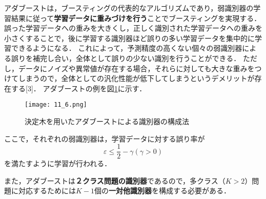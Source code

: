 \documentclass[dvipdfmx]{jreport}
\begin{document}
アダブーストは，ブースティングの代表的なアルゴリズムであり，弱識別器の学習結果に従って\textbf{学習データに重みづけを行う}ことでブースティングを実現する．
誤った学習データへの重みを大きくし，正しく識別された学習データへの重みを小さくすることで，後に学習する識別器ほど誤りの多い学習データを集中的に学習できるようになる．
これによって，予測精度の高くない個々の弱識別器による誤りを補完し合い，全体として誤りの少ない識別を行うことができる．
ただし，データにノイズや異常値が存在する場合，それらに対しても大きな重みをつけてしまうので，全体としての汎化性能が低下してしまうというデメリットが存在する[3]．
アダブーストの例を図\ref{fig:6}に示す．

\begin{figure}[h]
    \begin{center}
        \texttt{[image: 11\_6.png]}
        \caption{決定木を用いたアダブーストによる識別器の構成法}\label{fig:6}
    \end{center}
\end{figure}

ここで，それぞれの弱識別器は，学習データに対する誤り率が
\begin{equation}
    \varepsilon\leq \frac{1}{2} - \gamma (\gamma>0) \label{eq:24}
\end{equation}
を満たすように学習が行われる．

また，アダブーストは\textbf{２クラス問題の識別器}であるので，多クラス（$K > 2$）問題に対応するためには$K-1$個の\textbf{一対他識別器}を構成する必要がある．
\end{document}
